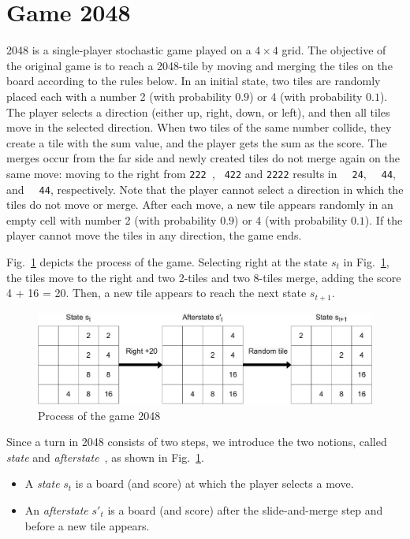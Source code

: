 \section{Game 2048}

2048 is a single-player stochastic game played on a $4 \times 4$ grid.
The objective of the original game is to reach a 2048-tile by moving and merging
the tiles on the board according to the rules below.
In an initial state, two tiles are randomly placed each with a number 2 (with probability $0.9$) or 4 (with probability $0.1$).
The player selects a direction (either up, right, down, or left), and then all tiles move in the selected direction.
When two tiles of the same number collide, they create a tile with the sum value, and the player gets the sum as the score.
The merges occur from the far side and newly created tiles do not merge again on the same move: moving to the right from \verb*|222 |, \verb*| 422| and \verb*|2222| results in
\verb*|  24|, \verb*|  44|, and \verb*|  44|, respectively.
Note that the player cannot select a direction in which the tiles do not move or merge.
After each move, a new tile appears randomly in an empty cell with number 2 (with probability $0.9$) or 4 (with probability $0.1$).
If the player cannot move the tiles in any direction, the game ends.

Fig.~\ref{fig:states-and-afterstates} depicts the process of the game.
Selecting right at the state $s_t$ in Fig.~\ref{fig:states-and-afterstates}, the tiles move to the right and
two 2-tiles and two 8-tiles merge, adding the score 4 + 16 = 20.
Then, a new tile appears to reach the next state $s_{t+1}$.

\begin{figure}
  \centering\includegraphics[width=.8\linewidth]{figures/state_afterstate.pdf}
 \caption{Process of the game 2048}
 \label{fig:states-and-afterstates}
\end{figure}

Since a turn in 2048 consists of two steps, we introduce the two notions, called \emph{state} and \emph{afterstate}~\cite{SzJa14}, as shown in Fig.~\ref{fig:states-and-afterstates}.
\begin{itemize}
 \item A \emph{state} $s_t$ is a board (and score) at which the player selects a move.
 \item An \emph{afterstate} $s'_t$ is a board (and score) after the slide-and-merge step and before a new tile appears.
\end{itemize}

